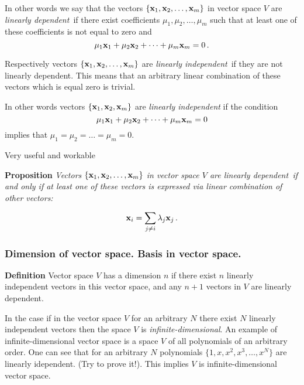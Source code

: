 \documentclass[12pt]{article}
\numberwithin{equation}{section}
\begin{document}
In other words we say that the vectors $\{{\bf x}_1,{\bf x}_2,\dots,{\bf x}_m\}$ in vector space $V$ are {\it linearly dependent\,} if there exist
coefficients $\mu_1,\mu_2,\dots,\mu_m$ such that at least one of these coefficients is not equal to zero and
               \begin{equation}\label{defoflindepend}
             \mu_1{\bf x}_1+\mu_2{\bf x}_2+\dots+\mu_m{\bf x}_m=0\,.
                 \end{equation}

Respectively  vectors $\{{\bf x}_1,{\bf x}_2,\dots,{\bf x}_m\}$ are {\it linearly independent\,} if they are not linearly dependent.
  This means that an arbitrary linear combination of these vectors which is equal  zero is trivial.

In other words
vectors $\{{\bf x}_1,{\bf x}_2,{\bf x}_m\}$ are {\it linearly independent} if the condition
                      $$
                      \mu_1{\bf x}_1+\mu_2{\bf x}_2+\dots+\mu_m{\bf x}_m=0
                      $$
implies that $\mu_1=\mu_2=\dots=\mu_m=0$.



Very useful and workable

{\bf Proposition }
{\it Vectors $\{{\bf x}_1,{\bf x}_2,\dots,{\bf x}_m\}$ in vector space $V$ are {\it linearly dependent\,}
if and only if at least one of these vectors is expressed via linear combination of other vectors:}

               \begin{equation*}\label{lineardependant}
             {\bf x}_i=\sum_{j\not =i}\lambda_j{\bf x}_j\,.
               \end{equation*}


   \subsubsection {Dimension of vector space. 
Basis in vector space.}\label{basis}


{\bf Definition }  Vector space $V$ has a dimension $n$  if 
there exist $n$  linearly independent vectors
in this vector space, and  any $n+1$ vectors in $V$ are  linearly dependent.

{\footnotesize In the
case if in the vector space $V$ for an arbitrary $N$
there exist $N$
linearly independent vectors
then the space $V$ is {\it infinite-dimensional}.
An example of infinite-dimensional vector space is a space $V$
of all polynomials of an arbitrary order. One can see that
for an arbitrary $N$ polynomials
           $\{1,x,x^2,x^3,\dots,x^N\}$
are linearly idependent. (Try to prove it!).
This implies $V$ is infinite-dimensional vector space.
}
\end{document}
